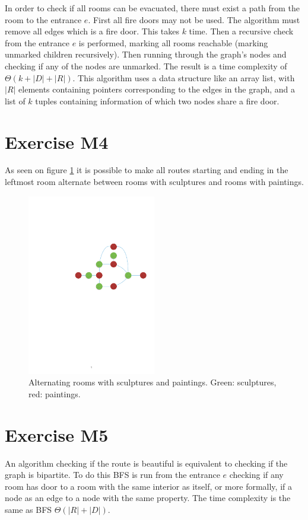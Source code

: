 \documentclass[10pt]{article}
\begin{document}
In order to check if all rooms can be evacuated, there must exist a path from the room to the entrance $e$. First all fire doors may not be used. The algorithm must remove all edges which is a fire door. This takes $k$ time. Then a recursive check from the entrance $e$ is performed, marking all rooms reachable (marking unmarked children recursively). Then running through the graph's nodes and checking if any of the nodes are unmarked. The result is a time complexity of $\Theta(k+|D| + |R|)$. This algorithm uses a data structure like an array list, with $|R|$ elements containing pointers corresponding to the edges in the graph, and a list of $k$ tuples containing information of which two nodes share a fire door.

\section*{Exercise M4}

As seen on figure \ref{fig:sculptureorpainting} it is possible to make all routes starting and ending in the leftmost room alternate between rooms with sculptures and rooms with paintings. 

\begin{figure}[H]
    \centering
    \includegraphics[width=0.5\textwidth]{floorplanSP}
    \caption{Alternating rooms with sculptures and paintings. Green: sculptures, red: paintings.}
    \label{fig:sculptureorpainting}
\end{figure}



\section*{Exercise M5}

An algorithm checking if the route is beautiful is equivalent to checking if the graph is bipartite. To do this BFS is run from the entrance $e$ checking if any room has door to a room with the same interior as itself, or more formally, if a node as an edge to a node with the same property. The time complexity is the same as BFS $\Theta(|R| + |D|)$. 
\end{document}

